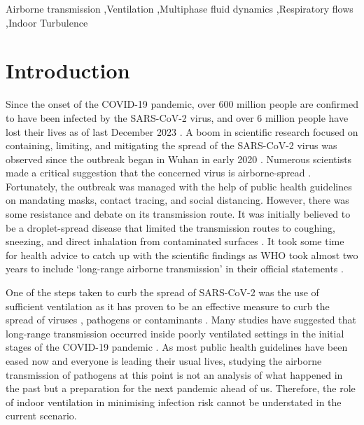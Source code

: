 \documentclass[a4paper,12pt]{elsarticle}
\begin{document}
\begin{frontmatter}
\begin{keyword}
Airborne transmission \sep Ventilation \sep Multiphase fluid dynamics \sep Respiratory flows \sep Indoor Turbulence

\end{keyword}

\end{frontmatter}


\section{Introduction}
\label{sec:sample1}

Since the onset of the COVID-19 pandemic, over 600 million people are confirmed to have been infected by the SARS-CoV-2 virus, and over 6 million people have lost their lives as of last December 2023 \cite{world2023therapeutics}. A boom in scientific research focused on containing, limiting, and mitigating the spread of the SARS-CoV-2 virus was observed since the outbreak began in Wuhan in early 2020 \cite{morawska2020can,morawska2020time}. Numerous scientists made a critical suggestion that the concerned virus is airborne-spread \cite{zhang2020identifying,bazant2021guideline,morawska2020airborne}. Fortunately, the outbreak was managed with the help of public health guidelines on mandating masks, contact tracing, and social distancing. However, there was some resistance and debate on its transmission route. It was initially believed to be a droplet-spread disease that limited the transmission routes to coughing, sneezing, and direct inhalation from contaminated surfaces \citep{chagla2021re}. It took some time for health advice to catch up with the scientific findings as WHO took almost two years to include `long-range airborne transmission' in their official statements \cite{lewis2022took}. 

One of the steps taken to curb the spread of SARS-CoV-2 was the use of sufficient ventilation as it has proven to be an effective measure to curb the spread of viruses \cite{ren2021numerical}, pathogens \cite{berrouk2010experimental} or contaminants \cite{li2020investigating}. Many studies have suggested that long-range transmission occurred inside poorly ventilated settings in the initial stages of the COVID-19 pandemic \cite{morawska2020can,li2021probable, liu2021simulation}. As most public health guidelines have been eased now and everyone is leading their usual lives, studying the airborne transmission of pathogens at this point is not an analysis of what happened in the past but a preparation for the next pandemic ahead of us. Therefore, the role of indoor ventilation in minimising infection risk cannot be understated in the current scenario.
\end{document}
